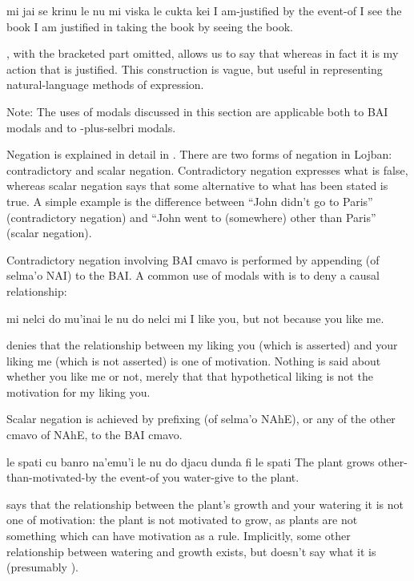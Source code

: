 \begin{example}
mi jai se krinu le nu mi viska le cukta kei\n
\T	{}\n
I am-justified by the event-of I see the book\n
{}\n
I am justified in taking the book by seeing the book.
\end{example}

, with the bracketed part
    omitted, allows us to say that  whereas in
    fact it is my action that is justified. This construction is
    vague, but useful in representing natural-language methods of
    expression. 

Note: The uses of modals discussed in this section are
    applicable both to BAI modals and to -plus-selbri
    modals.



Negation is explained in detail in . There are two forms of
    negation in Lojban: contradictory and scalar negation.
    Contradictory negation expresses what is false, whereas scalar
    negation says that some alternative to what has been stated is
    true. A simple example is the difference between ``John didn't
    go to Paris'' (contradictory negation) and ``John went to
    (somewhere) other than Paris'' (scalar negation).

Contradictory negation involving BAI cmavo is performed by
    appending  (of selma'o NAI) to the BAI. A common use of
    modals with  is to deny a causal relationship:
\begin{example}
mi nelci do mu'inai le nu do nelci mi\n
I like you, but not because you like me.
\end{example}

 denies that the relationship
    between my liking you (which is asserted) and your liking me
    (which is not asserted) is one of motivation. Nothing is said
    about whether you like me or not, merely that that hypothetical
    liking is not the motivation for my liking you. 

Scalar negation is achieved by prefixing  (of
    selma'o NAhE), or any of the other cmavo of NAhE, to the BAI
    cmavo.
\begin{example}
le spati cu banro na'emu'i le nu\n
\T	do djacu dunda fi le spati\n
The plant grows other-than-motivated-by the event-of\n
\T	you water-give to the plant.
\end{example}

 says that the relationship
    between the plant's growth and your watering it is not one of
    motivation: the plant is not motivated to grow, as plants are
    not something which can have motivation as a rule. Implicitly,
    some other relationship between watering and growth exists, but
     doesn't say what it is
    (presumably ). 

